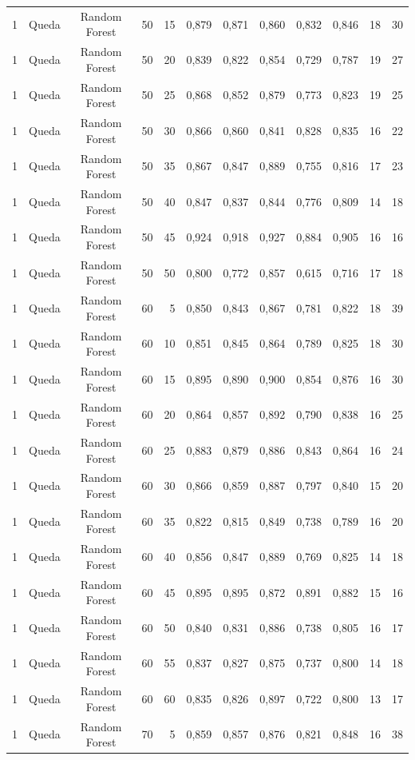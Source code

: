 \begin{longtable}{ccclrrrrrrrr}
1 & Queda & Random Forest & 50 & 15 & 0,879 & 0,871 & 0,860 & 0,832 & 0,846 & 18 & 30 \\
1 & Queda & Random Forest & 50 & 20 & 0,839 & 0,822 & 0,854 & 0,729 & 0,787 & 19 & 27 \\
1 & Queda & Random Forest & 50 & 25 & 0,868 & 0,852 & 0,879 & 0,773 & 0,823 & 19 & 25 \\
1 & Queda & Random Forest & 50 & 30 & 0,866 & 0,860 & 0,841 & 0,828 & 0,835 & 16 & 22 \\
1 & Queda & Random Forest & 50 & 35 & 0,867 & 0,847 & 0,889 & 0,755 & 0,816 & 17 & 23 \\
1 & Queda & Random Forest & 50 & 40 & 0,847 & 0,837 & 0,844 & 0,776 & 0,809 & 14 & 18 \\
1 & Queda & Random Forest & 50 & 45 & 0,924 & 0,918 & 0,927 & 0,884 & 0,905 & 16 & 16 \\
1 & Queda & Random Forest & 50 & 50 & 0,800 & 0,772 & 0,857 & 0,615 & 0,716 & 17 & 18 \\
1 & Queda & Random Forest & 60 & 5 & 0,850 & 0,843 & 0,867 & 0,781 & 0,822 & 18 & 39 \\
1 & Queda & Random Forest & 60 & 10 & 0,851 & 0,845 & 0,864 & 0,789 & 0,825 & 18 & 30 \\
1 & Queda & Random Forest & 60 & 15 & 0,895 & 0,890 & 0,900 & 0,854 & 0,876 & 16 & 30 \\
1 & Queda & Random Forest & 60 & 20 & 0,864 & 0,857 & 0,892 & 0,790 & 0,838 & 16 & 25 \\
1 & Queda & Random Forest & 60 & 25 & 0,883 & 0,879 & 0,886 & 0,843 & 0,864 & 16 & 24 \\
1 & Queda & Random Forest & 60 & 30 & 0,866 & 0,859 & 0,887 & 0,797 & 0,840 & 15 & 20 \\
1 & Queda & Random Forest & 60 & 35 & 0,822 & 0,815 & 0,849 & 0,738 & 0,789 & 16 & 20 \\
1 & Queda & Random Forest & 60 & 40 & 0,856 & 0,847 & 0,889 & 0,769 & 0,825 & 14 & 18 \\
1 & Queda & Random Forest & 60 & 45 & 0,895 & 0,895 & 0,872 & 0,891 & 0,882 & 15 & 16 \\
1 & Queda & Random Forest & 60 & 50 & 0,840 & 0,831 & 0,886 & 0,738 & 0,805 & 16 & 17 \\
1 & Queda & Random Forest & 60 & 55 & 0,837 & 0,827 & 0,875 & 0,737 & 0,800 & 14 & 18 \\
1 & Queda & Random Forest & 60 & 60 & 0,835 & 0,826 & 0,897 & 0,722 & 0,800 & 13 & 17 \\
1 & Queda & Random Forest & 70 & 5 & 0,859 & 0,857 & 0,876 & 0,821 & 0,848 & 16 & 38 \\

\end{longtable}
